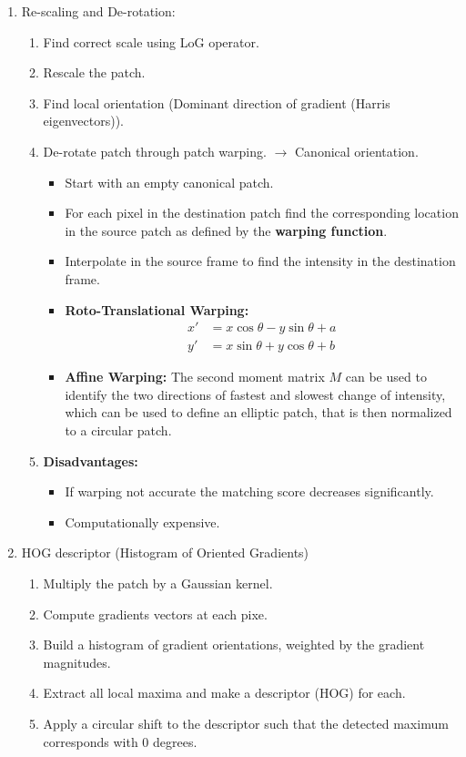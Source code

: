 \documentclass[10pt,a4paper]{scrartcl}
\begin{document}
\begin{multicols*}{2}
\begin{enumerate}
\item Re-scaling and De-rotation:
\begin{enumerate}
\item Find correct scale using LoG operator.
\item Rescale the patch.
\item Find local orientation (Dominant direction of gradient (Harris eigenvectors)).
\item De-rotate patch through patch warping. $\rightarrow$ Canonical orientation.
\begin{itemize}
\item Start with an empty canonical patch.
\item For each pixel in the destination patch find the corresponding location in the source patch as defined by the \textbf{warping function}.
\item Interpolate in the source frame to find the intensity in the destination frame.
\item \textbf{Roto-Translational Warping:} \begin{align*}
x'&=x\cos\theta-y\sin\theta+a\\y'&=x\sin\theta+y\cos\theta+b
\end{align*}
\item \textbf{Affine Warping:} The second moment matrix $M$ can be used to identify the two directions of fastest and slowest change of intensity, which can be used to define an elliptic patch, that is then normalized to a circular patch.
\end{itemize}
\item \textbf{Disadvantages:}
\begin{itemize}
\item If warping not accurate the matching score decreases significantly.
\item Computationally expensive.
\end{itemize}
\end{enumerate}
\item HOG descriptor (Histogram of Oriented Gradients)
\begin{enumerate}
\item Multiply the patch by a Gaussian kernel.
\item Compute gradients vectors at each pixe.
\item Build a histogram of gradient orientations, weighted by the gradient magnitudes.
\item Extract all local maxima and make a descriptor (HOG) for each.
\item Apply a circular shift to the descriptor such that the detected maximum corresponds with $0$ degrees.


\end{enumerate}
\end{enumerate}
\end{multicols*}
\end{document}
